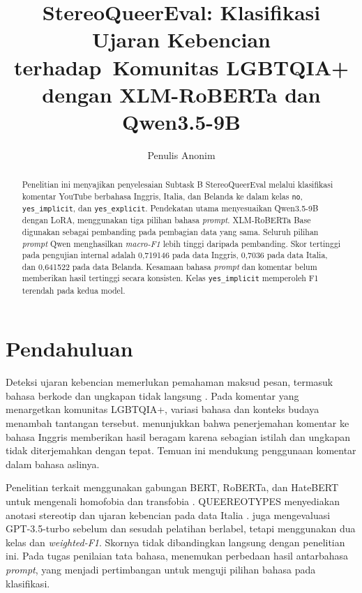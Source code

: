 \documentclass[11pt]{article}
\title{StereoQueerEval: Klasifikasi Ujaran Kebencian terhadap\
Komunitas LGBTQIA+ dengan XLM-RoBERTa dan Qwen3.5-9B}
\author{Penulis Anonim}
\begin{document}
\nolinenumbers
\raggedbottom
\maketitle
\begin{abstract}
Penelitian ini menyajikan penyelesaian Subtask B StereoQueerEval melalui klasifikasi komentar YouTube berbahasa Inggris, Italia, dan Belanda ke dalam kelas \texttt{no}, \texttt{yes\_implicit}, dan \texttt{yes\_explicit}. Pendekatan utama menyesuaikan Qwen3.5-9B dengan LoRA, menggunakan tiga pilihan bahasa \textit{prompt}. XLM-RoBERTa Base digunakan sebagai pembanding pada pembagian data yang sama. Seluruh pilihan \textit{prompt} Qwen menghasilkan \textit{macro-F1} lebih tinggi daripada pembanding. Skor tertinggi pada pengujian internal adalah 0,719146 pada data Inggris, 0,7036 pada data Italia, dan 0,641522 pada data Belanda. Kesamaan bahasa \textit{prompt} dan komentar belum memberikan hasil tertinggi secara konsisten. Kelas \texttt{yes\_implicit} memperoleh F1 terendah pada kedua model.
\end{abstract}

\section{Pendahuluan}
Deteksi ujaran kebencian memerlukan pemahaman maksud pesan, termasuk bahasa berkode dan ungkapan tidak langsung \citep{elsherief-etal-2021-latent}. Pada komentar yang menargetkan komunitas LGBTQIA+, variasi bahasa dan konteks budaya menambah tantangan tersebut. \citet{chan-etal-2024-hate} menunjukkan bahwa penerjemahan komentar ke bahasa Inggris memberikan hasil beragam karena sebagian istilah dan ungkapan tidak diterjemahkan dengan tepat. Temuan ini mendukung penggunaan komentar dalam bahasa aslinya.

Penelitian terkait menggunakan gabungan BERT, RoBERTa, dan HateBERT untuk mengenali homofobia dan transfobia \citep{nozza-2022-nozza}. QUEEREOTYPES menyediakan anotasi stereotip dan ujaran kebencian pada data Italia \citep{cignarella-etal-2024-queereotypes}. \citet{chan-etal-2024-hate} juga mengevaluasi GPT-3.5-turbo sebelum dan sesudah pelatihan berlabel, tetapi menggunakan dua kelas dan \textit{weighted-F1}. Skornya tidak dibandingkan langsung dengan penelitian ini. Pada tugas penilaian tata bahasa, \citet{behzad-etal-2024-ask} menemukan perbedaan hasil antarbahasa \textit{prompt}, yang menjadi pertimbangan untuk menguji pilihan bahasa pada klasifikasi.
\end{document}
